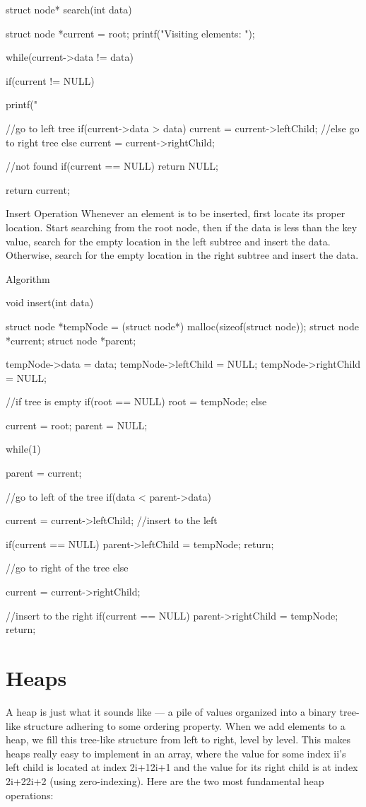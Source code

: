 struct node* search(int data){
   struct node *current = root;
   printf("Visiting elements: ");

   while(current->data != data){

      if(current != NULL) {
         printf("%

         //go to left tree
         if(current->data > data){
            current = current->leftChild;
         }//else go to right tree
         else {
            current = current->rightChild;
         }

         //not found
         if(current == NULL){
            return NULL;
         }
      }
   }
   return current;
}
Insert Operation
Whenever an element is to be inserted, first locate its proper location. Start searching from the root node, then if the data is less than the key value, search for the empty location in the left subtree and insert the data. Otherwise, search for the empty location in the right subtree and insert the data.

Algorithm

void insert(int data) {
   struct node *tempNode = (struct node*) malloc(sizeof(struct node));
   struct node *current;
   struct node *parent;

   tempNode->data = data;
   tempNode->leftChild = NULL;
   tempNode->rightChild = NULL;

   //if tree is empty
   if(root == NULL) {
      root = tempNode;
   } else {
      current = root;
      parent = NULL;

      while(1) {
         parent = current;

         //go to left of the tree
         if(data < parent->data) {
            current = current->leftChild;
            //insert to the left

            if(current == NULL) {
               parent->leftChild = tempNode;
               return;
            }
         }//go to right of the tree
         else {
            current = current->rightChild;

            //insert to the right
            if(current == NULL) {
               parent->rightChild = tempNode;
               return;
            }
         }
      }
   }
}

\section{Heaps}

A heap is just what it sounds like — a pile of values organized into a binary tree-like structure adhering to some ordering property. When we add elements to a heap, we fill this tree-like structure from left to right, level by level. This makes heaps really easy to implement in an array, where the value for some index ii's left child is located at index 2i+12i+1 and the value for its right child is at index 2i+22i+2 (using zero-indexing). Here are the two most fundamental heap operations:

